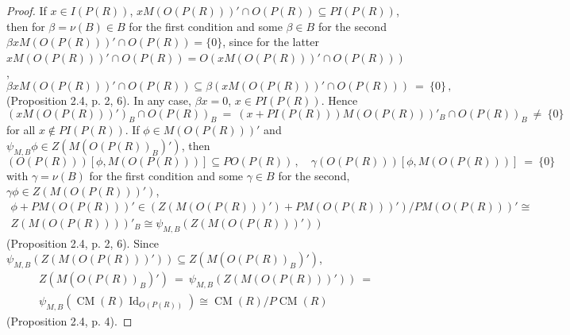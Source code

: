 \documentclass[a4paper,11pt]{article}
\DeclareMathOperator{\Id}{Id}
\DeclareMathOperator{\CM}{CM}
\begin{document}
\begin{proof}
If ${x\in I(P(R))}$, ${x M(O(P(R)))'\cap O(P(R))\subseteq P I(P(R))}$, then for 
${\beta=\nu(B)\in B}$ for the first condition and some ${\beta\in B}$ 
for the second ${\beta x M(O(P(R)))'\cap O(P(R))=\{0\}}$, since for the latter 
${x M(O(P(R)))'\cap O(P(R))=O(x M(O(P(R)))'\cap O(P(R)))}$, 
\[
\beta x M(O(P(R)))'\cap O(P(R))\subseteq \beta (x M(O(P(R)))'\cap O(P(R)))\ =\ 
\{0\}\,,
\]
(Proposition 2.4, p. 2, 6). In any case, ${\beta x=0}$, ${x\in P I(P(R))}$. 
Hence 
\[
(x M(O(P(R)))')_B\cap O(P(R))_B\ =\ (x+P I(P(R))) M(O(P(R)))'_B\cap O(P(R))_B
\ \ne\ \{0\}
\] 
for all ${x\notin P I(P(R))}$. If ${\phi\in M(O(P(R)))'}$ and 
${\psi_{M, B} \phi\in Z(M(O(P(R))_B)')}$, then  
\[
(O(P(R)))[\phi, M(O(P(R)))]\subseteq P O(P(R))\,,\quad 
\gamma (O(P(R)))[\phi, M(O(P(R)))]\ =\ 
\{0\}
\]
with ${\gamma=\nu(B)}$ for the first condition and some ${\gamma\in B}$ for 
the second, ${\gamma \phi\in Z(M(O(P(R)))')}$, 
\begin{multline*}
\phi+P M(O(P(R)))'\in (Z(M(O(P(R)))')+P M(O(P(R)))')/P M(O(P(R)))'\cong
\\
Z(M(O(P(R))))'_B\cong \psi_{M, B}(Z(M(O(P(R)))'))
\end{multline*}
(Proposition 2.4, p. 2, 6). Since 
${\psi_{M, B}(Z(M(O(P(R)))'))\subseteq Z(M(O(P(R))_B)')}$, 
\begin{multline*}
Z(M(O(P(R))_B)')\ =\ \psi_{M, B}(Z(M(O(P(R)))'))\ =
\\ 
\psi_{M, B}(\CM(R) \Id_{O(P(R))})\cong \CM(R)/P \CM(R)
\end{multline*}
(Proposition 2.4, p. 4).


\end{proof}
\end{document}
